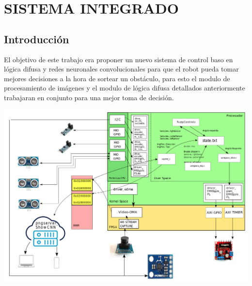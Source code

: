 \section{SISTEMA INTEGRADO}

\subsection{Introducción}

El objetivo de este trabajo era proponer un nuevo sistema de control baso en lógica difusa y redes neuronales convolucionales para que el robot pueda tomar mejores decisiones a la hora de sortear un obstáculo, para esto el modulo de procesamiento de imágenes y el modulo de lógica difusa detallados anteriormente trabajaran en conjunto para una mejor toma de decisión.\par


\begin{center}
    \includegraphics[scale=0.3]{Tesis/Capitulos/05_CAPITULO_3/BlockDiagram.png}
\end{center}
